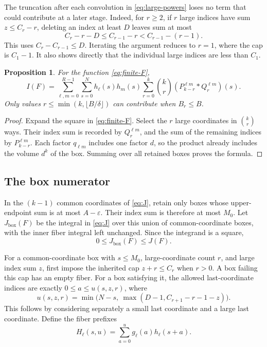 \documentclass[11pt,reqno]{amsart}
\newtheorem{proposition}[theorem]{Proposition}
\theoremstyle{definition}
\theoremstyle{remark}
\numberwithin{equation}{section}
\newcommand{\Jb}{J_{\mathrm{box}}}
\begin{document}
The truncation after each convolution in \eqref{eq:large-powers} loses
no term that could contribute at a later stage. Indeed, for $r\ge2$,
if $r$ large indices have sum $z\le C_r-r$, deleting an index at least $D$ leaves sum
at most
\[
 C_r-r-D\le C_{r-1}-r<C_{r-1}-(r-1).
\]
This uses $C_r-C_{r-1}\le D$. Iterating the argument reduces to $r=1$,
where the cap is $C_1-1$. It also shows directly that the individual
large indices are less than $C_1$.

\begin{proposition}\label{prop:finite-norm}
For the function \eqref{eq:finite-F},
\begin{equation}\label{eq:finite-I}
 I(F)=\sum_{\ell,m=0}^{R-1}\sum_{s=0}^{N}h_\ell(s)h_m(s)
       \sum_{r=0}^{k}\binom{k}{r}
       (P^{\ell m}_{k-r}*Q^{\ell m}_r)(s).
\end{equation}
Only values $r\le\min(k,\lfloor B/\delta\rfloor)$ can contribute when
$B_r\le B$.
\end{proposition}
\begin{proof}
Expand the square in \eqref{eq:finite-F}. Select the $r$ large
coordinates in $\binom{k}{r}$ ways. Their index sum is recorded by
$Q_r^{\ell m}$, and the sum of the remaining indices by
$P_{k-r}^{\ell m}$. Each factor $q_{\ell m}$ includes one factor $d$,
so the product already includes the volume $d^k$ of the box. Summing
over all retained boxes proves the formula.
\end{proof}

\subsection{The box numerator}
In the $(k-1)$ common coordinates of \eqref{eq:J}, retain only boxes
whose upper-endpoint sum is at most $A-\varepsilon$. Their index sum is
therefore at most $M_0$. Let $\Jb(F)$ be the integral in \eqref{eq:J}
over this union of common-coordinate boxes, with the inner fiber
integral left unchanged. Since the integrand is a square,
\begin{equation}\label{eq:box-lower}
 0\le\Jb(F)\le J(F).
\end{equation}

For a common-coordinate box with $s\le M_0$, large-coordinate count $r$,
and large index sum $z$, first impose the inherited cap $z+r\le C_r$
when $r>0$. A box failing this cap has an empty fiber. For a box satisfying
it, the allowed last-coordinate indices are exactly
$0\le a\le u(s,z,r)$, where
\begin{equation}\label{eq:fiber-cutoff}
 u(s,z,r)=\min\bigl(N-s,\ \max(D-1,C_{r+1}-r-1-z)\bigr).
\end{equation}
This follows by considering separately a small last coordinate and a
large last coordinate. Define the fiber prefixes
\begin{equation}\label{eq:prefix}
 H_\ell(s,u)=\sum_{a=0}^{u}g_\ell(a)h_\ell(s+a).
\end{equation}
\end{document}
